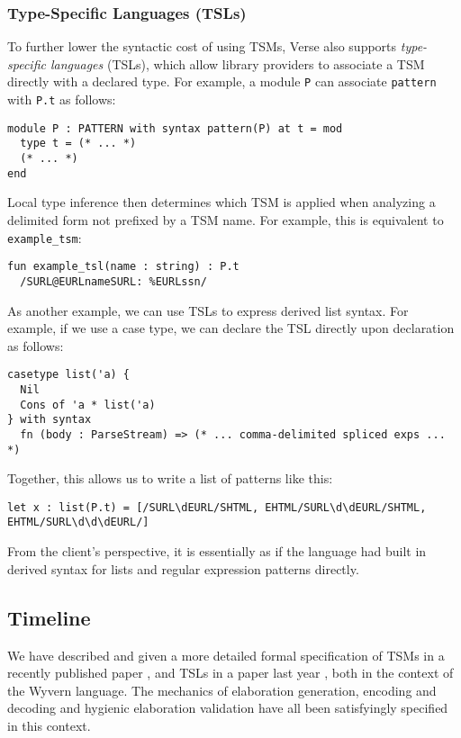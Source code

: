\subsubsection{Type-Specific Languages (TSLs)}
To further lower the syntactic cost of using TSMs, Verse also  supports \emph{type-specific languages} (TSLs), which allow library providers to associate a TSM directly with a declared type. For example, a module \lstinline{P} can associate \lstinline{pattern} with \lstinline{P.t} as follows:
\begin{lstlisting}[numbers=none]
module P : PATTERN with syntax pattern(P) at t = mod 
  type t = (* ... *)
  (* ... *)
end 
\end{lstlisting}

 Local type inference then determines which TSM is applied when analyzing a delimited form not prefixed by a TSM name. For example, this is equivalent to \lstinline{example_tsm}:
\begin{lstlisting}[numbers=none]
fun example_tsl(name : string) : P.t
  /SURL@EURLnameSURL: %EURLssn/
\end{lstlisting}

As another example, we can use TSLs to express derived list syntax. For example, if we use a case type, we can declare the TSL directly upon declaration as follows:
\begin{lstlisting}[numbers=none]
casetype list('a) {
  Nil
  Cons of 'a * list('a)
} with syntax
  fn (body : ParseStream) => (* ... comma-delimited spliced exps ... *)
\end{lstlisting}
Together, this allows us to write a list of patterns like this:
\begin{lstlisting}[numbers=none]
let x : list(P.t) = [/SURL\dEURL/SHTML, EHTML/SURL\d\dEURL/SHTML, EHTML/SURL\d\d\dEURL/]
\end{lstlisting}
From the client's perspective, it is essentially as if the language had built in derived syntax for lists and regular expression patterns directly. %
\subsection{Timeline}\label{sec:syntax-timeline}
We have described and given a more detailed formal specification of TSMs in a recently published paper \cite{sac15}, and TSLs in a paper last year \cite{TSLs}, both in the context of the Wyvern language. The mechanics of elaboration generation, encoding and decoding and hygienic elaboration validation have all been satisfyingly specified in this context. 

